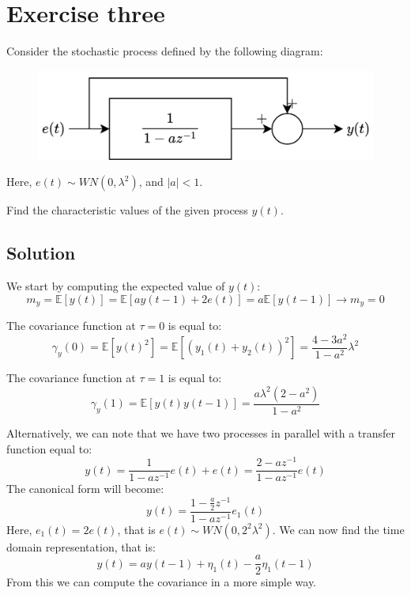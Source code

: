 \section{Exercise three}

Consider the stochastic process defined by the following diagram:
\begin{figure}[H]
    \centering
    \includegraphics[width=0.5\linewidth]{images/block2.png}
\end{figure}
Here, $e(t) \sim WN(0,\lambda^2)$, and $\left\lvert a\right\rvert <1$.

Find the characteristic values of the given process $y(t)$. 

\subsection{Solution}
We start by computing the expected value of $y(t)$: 
\[m_y=\mathbb{E}\left[ y(t) \right]=\mathbb{E}\left[ ay(t-1)+2e(t) \right]=a\mathbb{E}\left[ y(t-1) \right]\rightarrow m_y=0\]

The covariance function at $\tau=0$ is equal to: 
\[\gamma_y(0)=\mathbb{E}\left[ y(t)^2 \right]=\mathbb{E}\left[ \left(y_1(t)+y_2(t)\right)^2 \right]=\dfrac{4-3a^2}{1-a^2}\lambda^2\]

The covariance function at $\tau=1$ is equal to: 
\[\gamma_y(1)=\mathbb{E}\left[ y(t)y(t-1) \right]=\dfrac{a\lambda^2(2-a^2)}{1-a^2}\]

Alternatively, we can note that we have two processes in parallel with a transfer function equal to: 
\[y(t)=\dfrac{1}{1-az^{-1}}e(t)+e(t)=\dfrac{2-az^{-1}}{1-az^{-1}}e(t)\]
The canonical form will become: 
\[y(t)=\dfrac{1-\frac{a}{2}z^{-1}}{1-az^{-1}}e_1(t)\]
Here, $e_1(t)=2e(t)$, that is $e(t) \sim WN(0,2^2\lambda^2)$. 
We can now find the time domain representation, that is: 
\[y(t)=ay(t-1)+\eta_1(t)-\dfrac{a}{2}\eta_1(t-1)\]
From this we can compute the covariance in a more simple way. 